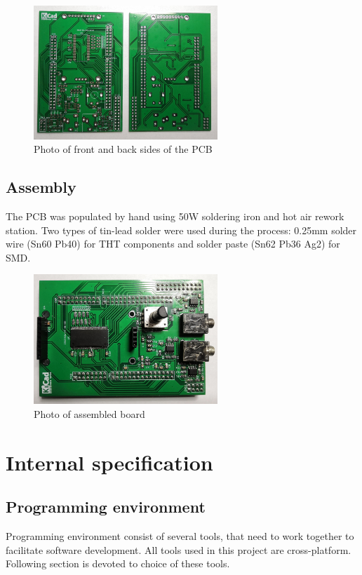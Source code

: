 \documentclass[a4paper,twoside,12pt]{book}
\begin{document}
\begin{figure}[H]
    \centering
    \includegraphics[width=0.618\textwidth]{images/photo_boards}
    \caption{Photo of front and back sides of the PCB}
    \label{fig:photo_boards}
\end{figure}

\section{Assembly}
The PCB was populated by hand using 50W soldering iron and hot air rework station.
Two types of tin-lead solder were used during the process:
0.25mm solder wire (Sn60 Pb40) for THT components and solder paste (Sn62 Pb36 Ag2) for SMD.

\begin{figure}[H]
    \centering
    \includegraphics[width=0.618\textwidth]{images/photo_assembled}
    \caption{Photo of assembled board}
    \label{fig:pgoto_assembled}
\end{figure}



\chapter{Internal specification}

\section{Programming environment}
Programming environment consist of several tools,
that need to work together to facilitate software development.
All tools used in this project are cross-platform.
Following section is devoted to choice of these tools.
\end{document}
